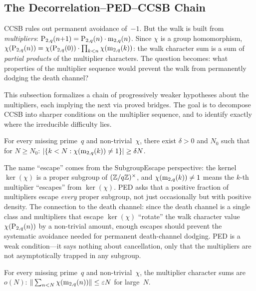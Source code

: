 \subsection{The Decorrelation--PED--CCSB Chain}
\label{sec:dec-chain}

CCSB rules out permanent avoidance of~$-1$.  But the walk is built
from \emph{multipliers}: $\mathrm{P}_{2,q}(n{+}1) = \mathrm{P}_{2,q}(n) \cdot
\mathrm{m}_{2,q}(n)$.  Since $\chi$ is a group homomorphism,
$\chi(\mathrm{P}_{2,q}(n)) = \chi(\mathrm{P}_{2,q}(0)) \cdot \prod_{k<n}
\chi(\mathrm{m}_{2,q}(k))$: the walk character sum is a sum of
\emph{partial products} of the multiplier characters.  The question
becomes: what properties of the multiplier sequence would prevent
the walk from permanently dodging the death channel?

This subsection formalizes a chain of progressively weaker hypotheses
about the multipliers, each implying the next via proved bridges.
The goal is to decompose CCSB into sharper conditions on the multiplier
sequence, and to identify exactly where the irreducible difficulty
lies.

\begin{property}
For every missing prime~$q$ and non-trivial~$\chi$, there exist
$\delta > 0$ and $N_0$ such that for $N \geq N_0$:
$|\{k < N : \chi(\mathrm{m}_{2,q}(k)) \neq 1\}| \geq \delta N$.
\end{property}

The name ``escape'' comes from the SubgroupEscape perspective: the
kernel $\ker(\chi)$ is a proper subgroup of $(\mathbb{Z}/q\mathbb{Z})^\times$, and
$\chi(\mathrm{m}_{2,q}(k)) \neq 1$ means the $k$-th multiplier ``escapes''
from $\ker(\chi)$.  PED asks that a positive fraction of multipliers
escape \emph{every} proper subgroup, not just occasionally but with
positive density.  The connection to the death channel: since the
death channel is a single class and multipliers that escape
$\ker(\chi)$ ``rotate'' the walk character value $\chi(\mathrm{P}_{2,q}(n))$
by a non-trivial amount, enough escapes should prevent the systematic
avoidance needed for permanent death-channel dodging.  PED is a weak
condition---it says nothing about cancellation, only that the
multipliers are not asymptotically trapped in any subgroup.

\begin{property}
For every missing prime~$q$ and non-trivial~$\chi$, the multiplier
character sums are $o(N)$:
$\|\sum_{n<N} \chi(\mathrm{m}_{2,q}(n))\| \leq \varepsilon N$ for large~$N$.
\end{property}


